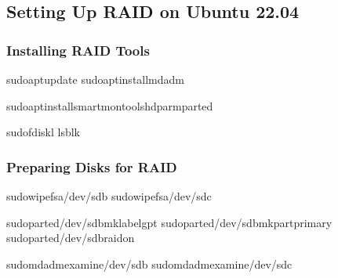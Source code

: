 \documentclass[letterpaper,10pt,english]{sphinxmanual}
\begin{document}
\subsection{Setting Up RAID on Ubuntu 22.04}
\label{\detokenize{raid-systems:setting-up-raid-on-ubuntu-22-04}}

\subsubsection{Installing RAID Tools}
\label{\detokenize{raid-systems:installing-raid-tools}}
\begin{sphinxVerbatim}[commandchars=\\\{\}]
sudoaptupdate
sudoaptinstallmdadm

sudoaptinstallsmartmontoolshdparmparted

sudofdisk\PYGZhy{}l
lsblk
\end{sphinxVerbatim}


\subsubsection{Preparing Disks for RAID}
\label{\detokenize{raid-systems:preparing-disks-for-raid}}
\begin{sphinxVerbatim}[commandchars=\\\{\}]
sudowipefs\PYGZhy{}a/dev/sdb
sudowipefs\PYGZhy{}a/dev/sdc

sudoparted/dev/sdbmklabelgpt
sudoparted/dev/sdbmkpartprimary\PYGZpc{}\PYGZpc{}
sudoparted/dev/sdbraidon

sudomdadm\PYGZhy{}\PYGZhy{}examine/dev/sdb
sudomdadm\PYGZhy{}\PYGZhy{}examine/dev/sdc
\end{sphinxVerbatim}
\end{document}
